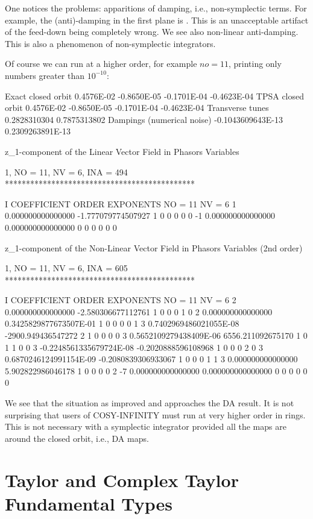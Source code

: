 \documentclass{hitec}     %
\newcommand{\Section}[1]{\section{#1}\vspace*{-1ex}}
\begin{document}
{{ 
 One notices the problems: apparitions of damping, i.e., non-symplectic terms. For example, the (anti)-damping in the first plane is . This is an unacceptable artifact of the feed-down being completely wrong. We see also non-linear anti-damping. This is also a phenomenon of non-symplectic integrators.
 
 
 Of course we can run at a higher order, for example $no=11$, printing only numbers greater than $10^{-10}$:
 
 \begin{code}
Exact closed orbit  0.4576E-02 -0.8650E-05 -0.1701E-04 -0.4623E-04
TPSA  closed orbit  0.4576E-02 -0.8650E-05 -0.1701E-04 -0.4623E-04
 Transverse tunes
  0.2828310304       0.7875313802
 Dampings (numerical noise)
 -0.1043609643E-13   0.2309263891E-13

 z_1-component of the Linear Vector Field in Phasors Variables

          1, NO =   11, NV =    6, INA =  494
 *********************************************

    I  COEFFICIENT          ORDER   EXPONENTS
      NO =    11      NV =     6
   1   0.000000000000000      -1.777079774507927       1  0  0  0  0  0
    -1   0.000000000000000       0.000000000000000       0  0  0  0  0  0

 z_1-component of the Non-Linear Vector Field in Phasors Variables (2nd order)

          1, NO =   11, NV =    6, INA =  605
 *********************************************

    I  COEFFICIENT          ORDER   EXPONENTS
      NO =    11      NV =     6
   2   0.000000000000000      -2.580306677112761       1  0  0  0  1  0
   2   0.000000000000000      0.3425829877673507E-01   1  0  0  0  0  1
   3  0.7402969486021055E-08  -2900.949436547272       2  1  0  0  0  0
   3  0.5652109279438409E-06   6556.211092675170       1  0  1  1  0  0
   3 -0.2248561335679724E-08 -0.2020888596108968       1  0  0  0  2  0
   3  0.6870246124991154E-09 -0.2080839306933067       1  0  0  0  1  1
   3   0.000000000000000       5.902822986046178       1  0  0  0  0  2
    -7   0.000000000000000       0.000000000000000       0  0  0  0  0  0
 \end{code}
  \renewcommand{\codefont}{\small}
  
 We see that the situation as improved and approaches the DA result.     It is not surprising that users of COSY-INFINITY must run at very higher order in rings. This is not necessary with a symplectic integrator provided all the maps are around the closed orbit, i.e., DA maps.
\Section{Taylor and Complex Taylor Fundamental Types}
\label{s:fundamental}
 
}}
\end{document}
